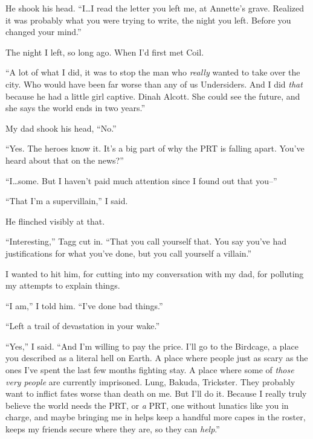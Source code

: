 He shook his head.  ``I\ldots I read the letter you left me, at Annette's grave.  Realized it was probably what you were trying to write, the night you left.  Before you changed your mind.''



The night I left, so long ago.  When I'd first met Coil.



``A lot of what I did, it was to stop the man who \emph{really} wanted to take over the city.  Who would have been far worse than any of us Undersiders.  And I did \emph{that} because he had a little girl captive.  Dinah Alcott.  She could see the future, and she says the world ends in two years.''



My dad shook his head, ``No.''



``Yes.  The heroes know it.  It's a big part of why the PRT is falling apart.  You've heard about that on the news?''



``I\ldots some.  But I haven't paid much attention since I found out that you--''



``That I'm a supervillain,'' I said.



He flinched visibly at that.



``Interesting,'' Tagg cut in.  ``That you call yourself that.  You say you've had justifications for what you've done, but you call yourself a villain.''



I wanted to hit him, for cutting into my conversation with my dad, for polluting my attempts to explain things.



``I am,'' I told him.  ``I've done bad things.''



``Left a trail of devastation in your wake.''



``Yes,'' I said.  ``And I'm willing to pay the price.  I'll go to the Birdcage, a place you described as a literal hell on Earth.  A place where people just as scary as the ones I've spent the last few months fighting stay.  A place where some of \emph{those very people} are currently imprisoned.  Lung, Bakuda, Trickster.  They probably want to inflict fates worse than death on me.  But I'll do it.  Because I really truly believe the world needs the PRT, or \emph{a} PRT, one without lunatics like you in charge, and maybe bringing me in helps keep a handful more capes in the roster, keeps my friends secure where they are, so they can \emph{help}.''



